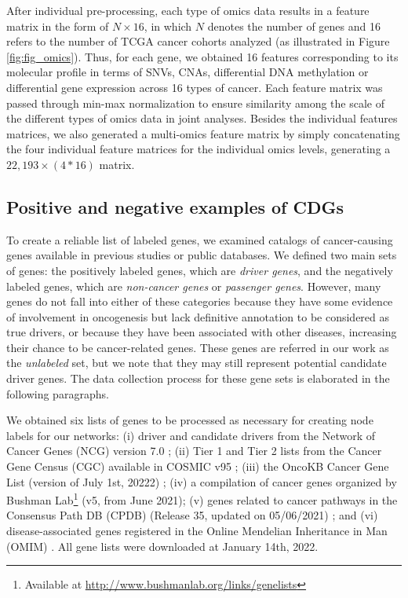After individual pre-processing, each type of omics data results in a feature matrix in the form of $N \times 16$, in which $N$ denotes the number of genes and 16 refers to the number of TCGA cancer cohorts analyzed (as illustrated in Figure \ref{fig:fig_omics}). Thus, for each gene, we obtained 16 features corresponding to its molecular profile in terms of SNVs, CNAs, differential DNA methylation or differential gene expression across 16 types of cancer. Each feature matrix was passed through min-max normalization to ensure similarity among the scale of the different types of omics data in joint analyses. Besides the individual features matrices, we also generated a multi-omics feature matrix by simply concatenating the four individual feature matrices for the individual omics levels, generating a $22,193 \times (4 * 16)$ matrix.


\subsection{Positive and negative examples of CDGs}
\label{sec:materials_methods:cdglabels}

To create a reliable list of labeled genes, we examined catalogs of cancer-causing genes available in previous studies or public databases. We defined two main sets of genes: the positively labeled genes, which are \textit{driver genes}, and the negatively labeled genes, which are \textit{non-cancer genes} or \textit{passenger genes}. However, many genes do not fall into either of these categories because they have some evidence of involvement in oncogenesis but lack definitive annotation to be considered as true drivers, or because they have been associated with other diseases, increasing their chance to be cancer-related genes. These genes are referred in our work as the \textit{unlabeled} set, but we note that they may still represent potential candidate driver genes. The data collection process for these gene sets is elaborated in the following paragraphs.

We obtained six lists of genes to be processed as necessary for creating node labels for our networks: (i) driver and candidate drivers from the Network of Cancer Genes (NCG) version 7.0 \cite{repana2019network}; (ii) Tier 1 and Tier 2 lists from the Cancer Gene Census (CGC) available in COSMIC v95 \cite{cosmic}; (iii) the OncoKB Cancer Gene List (version of July 1st, 20222) \cite{chakravarty2017oncokb}; (iv) a compilation of cancer genes organized by Bushman Lab\footnote{Available at \url{http://www.bushmanlab.org/links/genelists}} (v5, from June 2021); (v) genes related to cancer pathways in the Consensus Path DB (CPDB) (Release 35, updated on 05/06/2021) \cite{consensuspathdb}; and (vi) disease-associated genes registered in the Online Mendelian Inheritance in Man (OMIM) \cite{hamosh2000online}. All gene lists were downloaded at January 14th, 2022.

